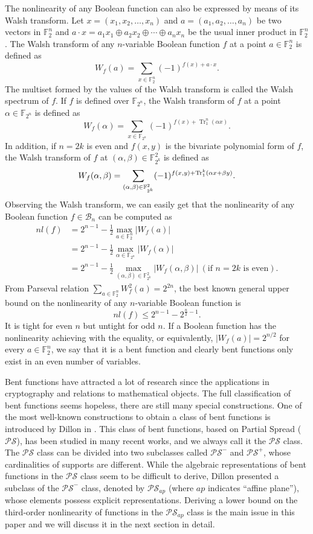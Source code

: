 \documentclass{article}
\newcommand{\F}{\mathbb{F}}
\newcommand{\0}{\textbf{0}}
\newcommand{\1}{\textbf{1}}
\newcommand{\TrN}{\operatorname{Tr}_1^n}
\theoremstyle{plain}
\begin{document}
    The nonlinearity of any Boolean function can also be expressed by means of its Walsh transform. 
    Let $x=(x_1,x_2,\dots,x_n)$ and $a=(a_1,a_2,\dots,a_n)$ be two vectors in $\F_2^n$ and $a\cdot x=a_1x_1\oplus a_2x_2\oplus\cdots\oplus a_nx_n$ be the usual inner product in $\F_2^n$. 
    The Walsh transform of any $n$-variable Boolean function $f$ at a point $a\in\F_2^n$ is defined as 
    \[W_f(a)=\sum_{x\in\F_2^n}(-1)^{f(x)+a\cdot x}.\]
    The multiset formed by the values of the Walsh transform is called the Walsh spectrum of $f$. 
    If $f$ is defined over $\F_{2^n}$, the Walsh transform of $f$ at a point $\alpha\in\F_{2^n}$ is defined as  
    \[W_f(\alpha)=\sum_{x\in\F_{2^n}}(-1)^{f(x)+\TrN(\alpha x)}.\]
    In addition, if $n=2k$ is even and $f(x,y)$ is the bivariate polynomial form of $f$, the Walsh transform of $f$ at $(\alpha,\beta)\in\F_{2^k}^2$ is defined as 
    \[W_f(\alpha,\beta)=\sum_{(\alpha,\beta)\in\F_{2^k}^2}(-1)^{f(x,y)+\Tr_1^k(\alpha x+\beta y)}.\]
    Observing the Walsh transform, we can easily get that the nonlinearity of any Boolean function $f\in\mathcal{B}_n$ can be computed as 
    \begin{align*}
        nl(f) &= 2^{n-1} - \frac{1}{2}\max_{a\in\F_2^n}|W_f(a)|\\
              &= 2^{n-1} - \frac{1}{2}\max_{\alpha\in\F_{2^n}}|W_f(\alpha)|\\
              &= 2^{n-1} - \frac{1}{2}\max_{(\alpha,\beta)\in\F_{2^k}^2}|W_f(\alpha,\beta)|~(\text{if }n=2k\text{ is even}). 
    \end{align*}
    From Parseval relation $\sum_{a\in\F_2^n}W_f^2(a)=2^{2n}$, the best known general upper bound on the nonlinearity of any $n$-variable Boolean function is 
    \[nl(f)\le 2^{n-1}-2^{\frac{n}{2}-1}.\]
    It is tight for even $n$ but untight for odd $n$. 
    If a Boolean function has the nonlinearity achieving with the equality, or equivalently, $\left\lvert W_f(a)\right\rvert=2^{n/2}$ for every $a\in\F_2^n$, we say that it is a bent function and clearly bent functions only exist in an even number of variables.  
    
    Bent functions have attracted a lot of research since the applications in cryptography and relations to mathematical objects. 
    The full classification of bent functions seems hopeless, there are still many special constructions. 
    One of the most well-known constructions to obtain a class of bent functions is introduced by Dillon in \cite{Dillon1974PSbent}. 
    This class of bent functions, based on Partial Spread ($\mathcal{PS}$), has been studied in many recent works, and we always call it the $\mathcal{PS}$ class. 
    The $\mathcal{PS}$ class can be divided into two subclasses called $\mathcal{PS}^-$ and $\mathcal{PS}^+$, whose cardinalities of supports are different. 
    While the algebraic representations of bent functions in the $\mathcal{PS}$ class seem to be difficult to derive, Dillon presented a subclass of the $\mathcal{PS}^-$ class, denoted by $\mathcal{PS}_{ap}$ (where $ap$ indicates ``affine plane''), whose elements possess explicit representations.  
    Deriving a lower bound on the third-order nonlinearity of functions in the $\mathcal{PS}_{ap}$ class is the main issue in this paper and we will discuss it in the next section in detail.
\end{document}
